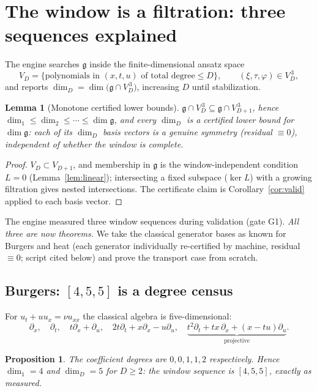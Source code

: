 \documentclass[11pt]{article}
\theoremstyle{plain}
\newtheorem{lemma}[theorem]{Lemma}
\newtheorem{proposition}[theorem]{Proposition}
\theoremstyle{definition}
\theoremstyle{remark}
\newcommand{\g}{\mathfrak{g}}
\begin{document}
\section{The window is a filtration: three sequences explained}\label{sec:window}

The engine searches $\g$ inside the finite-dimensional ansatz space
\[
V_D=\{\text{polynomials in }(x,t,u)\text{ of total degree}\le D\},\qquad
(\xi,\tau,\varphi)\in V_D^{\,3},
\]
and reports $\dim_D=\dim\big(\g\cap V_D^{\,3}\big)$, increasing $D$ until stabilization.

\begin{lemma}[Monotone certified lower bounds]\label{lem:window}
$\g\cap V_D^{\,3}\subseteq \g\cap V_{D+1}^{\,3}$, hence
$\dim_1\le\dim_2\le\cdots\le\dim\g$, and every $\dim_D$ is a \emph{certified lower bound} for
$\dim\g$: each of its $\dim_D$ basis vectors is a genuine symmetry (residual $\equiv0$),
independent of whether the window is complete.
\end{lemma}

\begin{proof}
$V_D\subset V_{D+1}$, and membership in $\g$ is the window-independent condition $L=0$
(Lemma~\ref{lem:linear}); intersecting a fixed subspace ($\ker L$) with a growing filtration gives
nested intersections. The certificate claim is Corollary~\ref{cor:valid} applied to each basis
vector.
\end{proof}

The engine measured three window sequences during validation (gate G1). \emph{All three are now
theorems.} We take the classical generator bases as known for Burgers and heat (each generator
individually re-certified by machine, residual $\equiv0$; script cited below) and prove the
transport case from scratch.

\subsection{Burgers: $[4,5,5]$ is a degree census}

For $u_t+uu_x=\nu u_{xx}$ the classical algebra is five-dimensional:
\[
\partial_x,\quad \partial_t,\quad t\partial_x+\partial_u,\quad 2t\partial_t+x\partial_x-u\partial_u,
\quad \underbrace{t^2\partial_t+tx\,\partial_x+(x-tu)\partial_u}_{\text{projective}} .
\]

\begin{proposition}\label{prop:burgers}
The coefficient degrees are $0,0,1,1,2$ respectively. Hence
$\dim_1=4$ and $\dim_D=5$ for $D\ge2$: the window sequence is $[4,5,5]$, exactly as measured.
\end{proposition}
\end{document}
